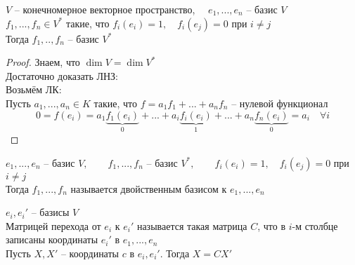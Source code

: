 \begin{lemma}
	$ V $ -- конечномерное векторное пространство, $ \quad e_1, ..., e_n $ -- базис $ V $ \\
	$ f_1, ..., f_n \in V^* $ такие, что $ f_i(e_i) = 1, \quad f_i(e_j) = 0 $ при $ i \ne j \quad $  \\
	Тогда $ f_1, .., f_n $ -- базис $ V^* $
\end{lemma}

\begin{proof}
	Знаем, что $ \dim V = \dim V^* $ \\
	Достаточно доказать ЛНЗ: \\
	Возьмём ЛК: \\
	Пусть $ a_1, ..., a_n \in K $ такие, что $ f = a_1f_1 + ... + a_nf_n $ -- нулевой функционал
	$$ 0 = f(e_i) = a_1\underbrace{f_1(e_i)}_0 + ... + a_i\underbrace{f_i(e_i)}_1 + ... + a_n\underbrace{f_n(e_i)}_0 = a_i \quad \forall i $$
\end{proof}

\begin{definition}
	$ e_1, ..., e_n $ -- базис $ V, \qquad f_1, ..., f_n $ -- базис $ V^*, \qquad f_i(e_i) = 1, \quad f_i(e_j) = 0 $ при $ i \ne j $ \\
	Тогда $ f_1, ..., f_n $ называется двойственным базисом к $ e_1, ..., e_n $
\end{definition}

\begin{remind}
	$ e_i, e_i' $ -- базисы $ V $ \\
	Матрицей перехода от $ e_i $ к $ e_i' $ называется такая матрица $ C $, что в $ i $-м столбце записаны координаты $ e_i' $ в $ e_1, ..., e_n $ \\
	Пусть $ X, X' $ -- координаты $ c $ в $ e_i, e_i' $. Тогда $ X = CX' $
\end{remind}

